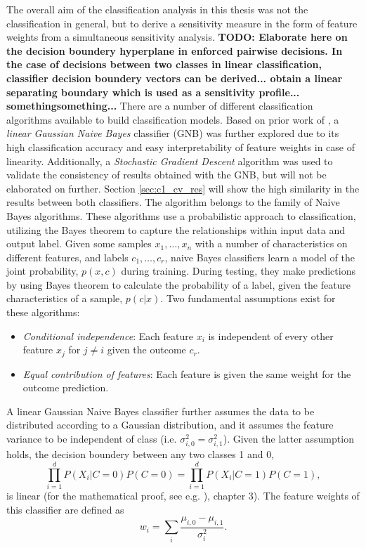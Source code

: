 \documentclass[a4paper, 12pt]{scrreprt}
\begin{document}
The overall aim of the classification analysis in this thesis was not the classification in general, but to derive a sensitivity measure in the form of feature weights from a simultaneous sensitivity analysis. \textbf{TODO: Elaborate here on the decision boundery hyperplane in enforced pairwise decisions. In the case of decisions between two classes in linear classification, classifier decision boundery vectors can be derived... obtain a linear separating boundary which is used as a sensitivity profile... somethingsomething...} \newline
There are a number of different classification algorithms available to build classification models. Based on prior work of \textcite{nastase2016}, a \textit{linear Gaussian Naive Bayes} classifier (GNB) was further explored due to its high classification accuracy and easy interpretability of feature weights in case of linearity. Additionally, a \textit{Stochastic Gradient Descent} algorithm was used to validate the consistency of results obtained with the GNB, but will not be elaborated on further. Section \ref{sec:c1_cv_res} will show the high similarity in the results between both classifiers. \newline
The algorithm belongs to the family of Naive Bayes algorithms. These algorithms use a probabilistic approach to classification, utilizing the Bayes theorem to capture the relationships within input data and output label. Given some samples $x_1, \ldots, x_n$ with a number of characteristics on different features, and labels $c_1, \ldots, c_r$, naive Bayes classifiers learn a model of the joint probability, $p(x, c)$ during training. During testing, they make predictions by using Bayes theorem to calculate the probability of a label, given the feature characteristics of a sample, $p(c|x)$. Two fundamental assumptions exist for these algorithms: \newline 
\begin{itemize}
	\item \textit{Conditional independence}: Each feature $x_i$ is independent of every other feature $x_j$ for $j \neq i$ given the outcome $c_r$.
	\item \textit{Equal contribution of features}:  Each feature is given the same weight for the outcome prediction. 
\end{itemize} 
A linear Gaussian Naive Bayes classifier further assumes the data to be distributed according to a Gaussian distribution, and it assumes the feature variance to be independent of class (i.e. $\sigma_{i, 0}^2 = \sigma_{i, 1}^2$). Given the latter assumption holds, the decision boundery between any two classes 1 and 0,
\begin{equation}
\prod_{i=1}^{d} P(X_i |C = 0)P(C=0) = \prod_{i=1}^{d} P(X_i |C = 1)P(C=1),
\end{equation}
is linear (for the mathematical proof, see e.g. \textcite{DBLP:books/daglib/0087929}), chapter 3). The feature weights of this classifier are defined as
\begin{equation}
w_i = \sum_{i}\frac{\mu_{i, 0}-\mu_{i, 1}}{\sigma_{i}^{2}}.
\end{equation}
\end{document}
